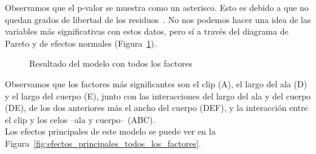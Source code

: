 \documentclass[12pt,a4paper,twoside,openright,titlepage,final]{article}
\begin{document}
Observamos que el p-valor se muestra como un asterisco. Esto es debido a que no quedan grados de libertad de los residuos~\cite{Asterik}. No nos podemos hacer una idea de las variables más significativas con estos datos, pero sí a través del diagrama de Pareto y de efectos normales (Figura~\ref{fig:resultado_experimento_fraccional_1}).\\

\begin{figure}[htbp!]
	\centering
	\caption{Resultado del modelo con todos los factores} \label{fig:resultado_experimento_fraccional_1}
\end{figure}

Observamos que los factores más significantes son el clip (A), el largo del ala (D) y el largo del cuerpo (E), junto con las interacciones del largo del ala y del cuerpo (DE), de los dos anteriores más el ancho del cuerpo (DEF), y la interacción entre el clip y los celos --ala y cuerpo-- (ABC).\\

Los efectos principales de este modelo se puede ver en la Figura~\ref{fig:efectos_principales_todos_los_factores}.\\
\end{document}
